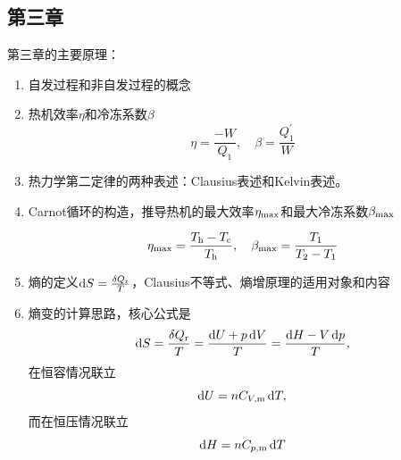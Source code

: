 \documentclass[9pt]{beamer}
\newcommand*{\dif}{\mathop{}\!\mathrm{d}}
\newcommand\m{{\rm m}}
\newcommand\rr{{\rm r}}
\begin{document}
	\subsection{第三章}
	\begin{frame}
	
	第三章的主要原理：
	\begin{enumerate}
	
	\item 自发过程和非自发过程的概念
	
	\item 热机效率$\eta$和冷冻系数$\beta$
	\[
		\eta = \frac{-W}{Q_1}, \quad \beta = \frac{Q^\prime_1}{W}
	\]
	
	\item 热力学第二定律的两种表述：Clausius表述和Kelvin表述。
	
	\item Carnot循环的构造，推导热机的最大效率$\eta_{\rm max}$和最大冷冻系数$\beta_{\rm max}$
	
	\[
		\eta_{\rm max} = \frac{T_{\rm h} - T_{\rm c}}{T_{\rm h}}, \quad \beta_{\rm max} = \frac{T_1}{T_2-T_1}
	\]
	
	\item 熵的定义$\dif S = \frac{\delta Q_\rr}{T}$，Clausius不等式、熵增原理的适用对象和内容
	
	\item 熵变的计算思路，核心公式是
	\[
		\dif S = \frac{\delta Q_\rr}{T} = \frac{\dif U + p \dif V}{T} = \frac{\dif H - V \dif p}{T},
	\]
	在恒容情况联立
	\[
		\dif U = n C_{V,\m} \dif T,
	\]
	而在恒压情况联立
	\[
		\dif H = n C_{p,\m} \dif T
	\]
	
	\end{enumerate}
	
	\end{frame}
	
\end{document}
